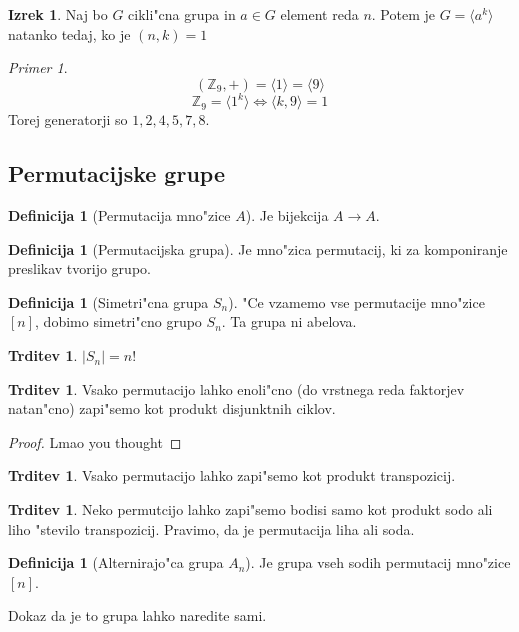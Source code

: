 \documentclass[11pt, a4paper]{article}
\theoremstyle{definition}
\newtheorem{defn}[counter]{Definicija}
\newtheorem{claim}[counter]{Trditev}
\newtheorem{theorem}[counter]{Izrek}
\theoremstyle{remark}
\newtheorem*{ex}{Primer}
\newcommand{\Z}{\mathbb{Z}}
\begin{document}
	\begin{theorem}
		Naj bo $G$ cikli"cna grupa in $a \in G$ element reda $n$. Potem je $G = \langle a^k \rangle$ natanko tedaj, ko je $(n,k) = 1$
	\end{theorem}
	\begin{ex}
		\[ (\Z_9, +) = \langle 1 \rangle = \langle 9 \rangle \]
		\[ \Z_9 = \langle 1^k \rangle \iff \langle k,9 \rangle = 1 \]
		Torej generatorji so $1, 2, 4, 5, 7, 8$.
	\end{ex}

	\subsection{Permutacijske grupe}
	\begin{defn}[Permutacija mno"zice $A$]
		Je bijekcija $A \rightarrow A$.
	\end{defn}
	
	\begin{defn}[Permutacijska grupa]
		Je mno"zica permutacij, ki za komponiranje preslikav tvorijo grupo.
	\end{defn}
	\begin{defn}[Simetri"cna grupa $S_n$]
		"Ce vzamemo vse permutacije mno"zice $[n]$, dobimo simetri"cno grupo $S_n$. Ta grupa ni abelova.
	\end{defn}
	\begin{claim}
		$|S_n| = n!$
	\end{claim}
		
	\begin{claim}
		Vsako permutacijo lahko enoli"cno (do vrstnega reda faktorjev natan"cno) zapi"semo kot produkt disjunktnih ciklov.
	\end{claim}
	\begin{proof}
		Lmao you thought
	\end{proof}
	\begin{claim}
		Vsako permutacijo lahko zapi"semo kot produkt transpozicij.
	\end{claim}

	\begin{claim}
		Neko permutcijo lahko zapi"semo bodisi samo kot produkt sodo ali liho "stevilo transpozicij. Pravimo, da je permutacija liha ali soda.
	\end{claim}

	\begin{defn}[Alternirajo"ca grupa $A_n$]
		Je grupa vseh sodih permutacij mno"zice $[n]$.
	\end{defn}
	Dokaz da je to grupa lahko naredite sami.
	
\end{document}
